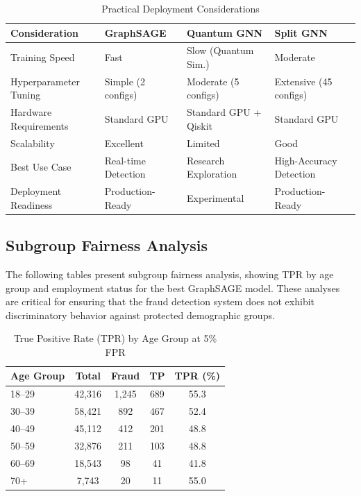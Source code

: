 \begin{table}[H]
\centering
\tablestrut
\caption{Practical Deployment Considerations}
\label{tab:gnn-deployment}
\small
\begin{tabularx}{\textwidth}{l>{\centering\arraybackslash}X>{\centering\arraybackslash}X>{\centering\arraybackslash}X}
\toprule
\textbf{Consideration} & \textbf{GraphSAGE} & \textbf{Quantum GNN} & \textbf{Split GNN} \\
\midrule
Training Speed         & Fast                    & Slow (Quantum Sim.)    & Moderate \\
Hyperparameter Tuning  & Simple (2 configs)      & Moderate (5 configs)   & Extensive (45 configs) \\
Hardware Requirements  & Standard GPU            & Standard GPU + Qiskit  & Standard GPU \\
Scalability            & Excellent               & Limited                & Good \\
Best Use Case          & Real-time Detection     & Research Exploration   & High-Accuracy Detection \\
Deployment Readiness   & Production-Ready        & Experimental           & Production-Ready \\
\bottomrule
\end{tabularx}
\end{table}

\subsection{Subgroup Fairness Analysis}

The following tables present subgroup fairness analysis, showing TPR by age group and employment status for the best GraphSAGE model. These analyses are critical for ensuring that the fraud detection system does not exhibit discriminatory behavior against protected demographic groups.

\begin{table}[H]
\centering
\tablestrut
\caption{True Positive Rate (TPR) by Age Group at 5\% FPR}
\label{tab:gnn-fairness-age}
\small
\begin{tabularx}{0.85\textwidth}{Xcccc}
\toprule
\textbf{Age Group} & {\textbf{Total}} & {\textbf{Fraud}} & {\textbf{TP}} & {\textbf{TPR (\%)}} \\
\midrule
18--29 & 42,316 & 1,245 & 689 & 55.3 \\
30--39 & 58,421 & 892   & 467 & 52.4 \\
40--49 & 45,112 & 412   & 201 & 48.8 \\
50--59 & 32,876 & 211   & 103 & 48.8 \\
60--69 & 18,543 & 98    & 41  & 41.8 \\
70+    & 7,743  & 20    & 11  & 55.0 \\
\bottomrule
\end{tabularx}
\end{table}

